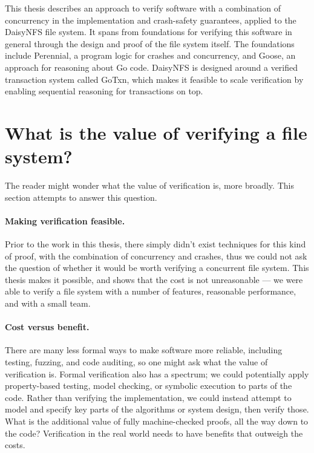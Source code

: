 This thesis describes an approach to verify software with a combination of
concurrency in the implementation and crash-safety guarantees, applied to the
DaisyNFS file system. It spans from foundations for verifying this software in
general through the design and proof of the file system itself. The foundations
include Perennial, a program logic for crashes and concurrency, and Goose, an
approach for reasoning about Go code. DaisyNFS is designed around a verified
transaction system called GoTxn, which makes it feasible to scale verification
by enabling sequential reasoning for transactions on top.

\section{What is the value of verifying a file system?}

The reader might wonder what the value of verification is, more broadly. This
section attempts to answer this question.

\paragraph{Making verification feasible.}
Prior to the work in this thesis, there simply didn't exist techniques for this
kind of proof, with the combination of concurrency and crashes,
thus we could not ask the question of whether it would be worth
verifying a concurrent file system. This thesis makes it possible, and shows
that the cost is not unreasonable --- we were able to verify a file system with
a number of features, reasonable performance, and with a small team.

\paragraph{Cost versus benefit.}
There are many less formal ways to make
software more reliable, including testing, fuzzing, and code auditing, so one
might ask what the value of verification is. Formal
verification also has a spectrum; we could potentially apply property-based
testing, model checking, or symbolic execution to parts of the code. Rather than
verifying the implementation, we could instead attempt to model and specify key
parts of the algorithms or system design, then verify those. What is the
additional value of fully machine-checked proofs, all the way down to the code?
Verification in the real world needs to have benefits that outweigh the costs.

